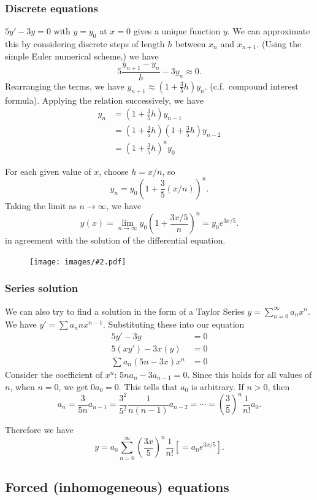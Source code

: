 \documentclass[a4paper]{article}
\theoremstyle{definition}
\newcommand{\img}[2][]{\begin{figure}[ht]\centering\texttt{[image: images/\#2.pdf]}\end{figure}}
\begin{document}
\subsubsection{Discrete equations}
$5y' - 3y = 0$ with $y = y_0$ at $x = 0$ gives a unique function $y$. We can approximate this by considering discrete steps of length $h$ between $x_n$ and $x_{n+1}$. (Using the simple Euler numerical scheme,) we have
\[
5\frac{y_{n+1} - y_n}{h} - 3y_n \approx 0.
\]
Rearranging the terms, we have $y_{n+1} \approx (1 + \frac{3}{5}h)y_n$. (c.f.\ compound interest formula). Applying the relation successively, we have 
\begin{align*}
  y_n &= \left(1 + \frac{3}{5}h\right)y_{n - 1}\\
  &= \left(1 + \frac{3}{5}h\right)\left(1 + \frac{3}{5}h\right)y_{n - 2}\\
  &= \left(1 + \frac{3}{5}h\right)^ny_0
\end{align*}

For each given value of $x$, choose $h = x/n$, so
\[
y_n = y_0\left(1 + \frac{3}{5}(x/n)\right)^n.
\]
Taking the limit as $n\to \infty$, we have
\[
y(x) = \lim_{n\to \infty} y_0\left(1 + \frac{3x/5}{n}\right)^n = y_0 e^{3x/5}.
\]
in agreement with the solution of the differential equation.

\img{de_3}

\subsubsection{Series solution}
We can also try to find a solution in the form of a Taylor Series $y = \sum\limits_{n=0}^\infty a_nx^n$. We have $y' = \sum a_nnx^{n-1}$. Substituting these into our equation
\begin{align*}
  5y' - 3y &= 0\\
  5(xy')  - 3x(y) &= 0\\
  \sum a_n(5n - 3x)x^n &= 0
\end{align*}
Consider the coefficient of $x^n$: $5n a_n - 3 a_{n-1} = 0$. Since this holds for all values of $n$, when $n = 0$, we get $0a_0 = 0$. This tells that $a_0$ is arbitrary. If $n>0$, then
\[
a_n = \frac{3}{5n}a_{n-1} = \frac{3^2}{5^2}\frac{1}{n(n-1)}a_{n-2} = \cdots = \left(\frac{3}{5}\right)^n \frac{1}{n!}a_0.
\]

Therefore we have
\[
y = a_0\sum_{n = 0}^\infty \left(\frac{3x}{5}\right)^n\frac{1}{n!} \left[= a_0 e^{3x/5}\right].
\]

\subsection{Forced (inhomogeneous) equations}
\end{document}
